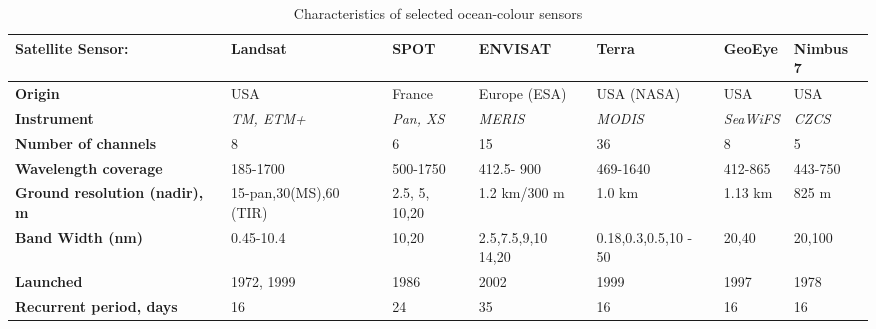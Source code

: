 \documentclass[11pt]{article}
\begin{document}
\begin{table}[htbp]
	\caption{Characteristics of selected ocean-colour sensors}
	\begin{center}
		\begin{tabular}{|p{2cm}|p{20mm}|p{15mm}|p{17mm}|p{15mm}|p{15mm}|p{15mm}|}
			\hline\hline
			\textbf{Satellite Sensor:} & {\textbf{Landsat}} & {\textbf{SPOT}} & {\textbf{ENVISAT}} & {\textbf{Terra}} & {\textbf{GeoEye}} & {\textbf{Nimbus 7}} \\ \hline\hline
				\textbf{Origin} & USA & France & Europe (ESA) & USA (NASA) & USA & USA \\ \hline
				\textbf{Instrument} & \textit{TM, ETM+} & \textit{Pan, XS} & \textit{MERIS} & \textit{MODIS} & \textit{SeaWiFS} & \textit{CZCS}\\ \hline
			\textbf{Number of channels} & 8 & 6 & 15 & 36 & 8 & 5 \\ \hline
			\textbf{Wavelength coverage} & 185-1700 & 500-1750 & 412.5- 900 & 469-1640 & 412-865 & 443-750 \\ \hline
			\textbf{Ground resolution (nadir), m} & 15-pan,30(MS),60 (TIR) & 2.5, 5, 10,20 & 1.2 km/300 m & 1.0 km & 1.13 km & 825 m \\ \hline
			\textbf{Band Width (nm)} & 0.45-10.4 & 10,20 & 2.5,7.5,9,10 14,20 & 0.18,0.3,0.5,10 - 50 & 20,40 & 20,100 \\ \hline
			\textbf{Launched} & 1972, 1999 & 1986 & 2002 & 1999 & 1997 & 1978 \\ \hline
			\textbf{Recurrent period, days} & 16 & 24 & 35 & 16 & 16 & 16 \\ \hline
		\end{tabular}
	\end{center}
	\label{tab:1}
\end{table}
\end{document}
